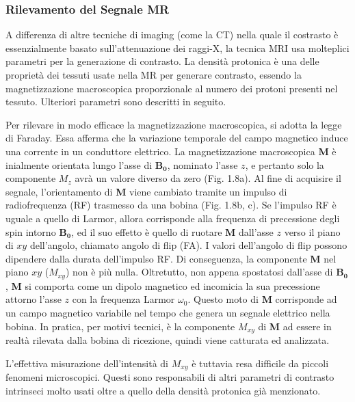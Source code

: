 \documentclass[leqno,10pt,twocolumn,a4paper]{article}
\begin{document}
	\subsubsection{Rilevamento del Segnale MR}
	A differenza di altre tecniche di imaging (come la CT) nella quale il costrasto è essenzialmente basato sull'attenuazione dei raggi-X, la tecnica MRI usa molteplici parametri per la generazione di contrasto. La densità protonica
	è una delle proprietà dei tessuti usate nella MR per generare contrasto, essendo la magnetizzazione macroscopica proporzionale al numero dei protoni presenti nel tessuto. Ulteriori parametri sono descritti in seguito.
	\par Per rilevare in modo efficace la magnetizzazione macroscopica, si adotta la legge di Faraday. Essa afferma che la variazione temporale del campo magnetico induce una corrente in un conduttore elettrico. La 
	magnetizzazione macroscopica \textbf{M} è inialmente orientata lungo l'asse di $\boldsymbol{B_0}$, nominato l'asse $z$, e pertanto solo la componente $M_z$ avrà un valore diverso da zero (Fig. 1.8a). Al fine di 
	acquisire il segnale, l'orientamento di \textbf{M} viene cambiato tramite un impulso di radiofrequenza (RF) trasmesso da una bobina (Fig. 1.8b, c). Se l'impulso RF è uguale a quello di Larmor, allora corrisponde alla
	frequenza di precessione degli spin intorno $\boldsymbol{B_0}$, ed il suo effetto è quello di ruotare \textbf{M} dall'asse $z$ verso il piano di $xy$ dell'angolo, chiamato angolo di flip (FA). I valori dell'angolo di flip
	possono dipendere dalla durata dell'impulso RF. Di conseguenza, la componente \textbf{M} nel piano $xy$ ($M_{xy}$) non è più nulla. Oltretutto, non appena spostatosi dall'asse di $\boldsymbol{B_0}$, \textbf{M}
	si comporta come un dipolo magnetico ed incomicia la sua precessione attorno l'asse $z$ con la frequenza Larmor $\omega_0$. Questo moto di \textbf{M} corrisponde ad un campo magnetico variabile nel tempo che
	genera un segnale elettrico nella bobina. In pratica, per motivi tecnici, è la componente $M_{xy}$ di \textbf{M} ad essere in realtà rilevata dalla bobina di ricezione, quindi viene catturata ed analizzata.
	\par L'effettiva misurazione dell'intensità di $M_{xy}$ è tuttavia resa difficile da piccoli fenomeni microscopici. Questi sono responsabili di altri parametri di contrasto intrinseci molto usati %
	oltre a quello della densità protonica già menzionato.
\end{document}
